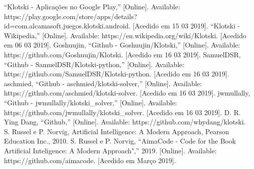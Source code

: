 \documentclass[conference]{IEEEtran}
\begin{document}
\begin{thebibliography}{00}
 “Klotski - Aplicações no Google Play,” [Online]. Available: https://play.google.com/store/apps/details?id=com.alcamasoft.juegos.klotski.android. [Acedido em 15 03 2019].
 “Klotski - Wikipedia,” [Online]. Available: https://en.wikipedia.org/wiki/Klotski. [Acedido em 06 03 2019].
 Goshuujin, “Github - Goshuujin/Klotski,” [Online]. Available: https://github.com/Goshuujin/Klotski. [Acedido em 16 03 2019].
 SamuelDSR, “Github - SamuelDSR/Klotski-python,” [Online]. Available: https://github.com/SamuelDSR/Klotski-python. [Acedido em 16 03 2019].
 aschmied, “Github - aschmied/klotski-solver,” [Online]. Available: https://github.com/aschmied/klotski-solver. [Acedido em 16 03 2019].
 jwmullally, “Github - jwmullally/klotski\_solver,” [Online]. Available: https://github.com/jwmullally/klotski\_solver. [Acedido em 16 03 2019].
 D. R. Ying Dang, “Github,” [Online]. Available: https://github.com/whydang/klotski.
  S. Russel e P. Norvig, Artificial Intelligence: A Modern Approach, Pearson Education Inc., 2010.
 S. Russel e P. Norvig, “AimaCode - Code for the Book Artificial Inteligence: A Modern Approach",” 2019. [Online]. Available: https://github.com/aimacode. [Acedido em Março 2019].


\end{thebibliography}
\vspace{12pt}
\color{red}
\end{document}
